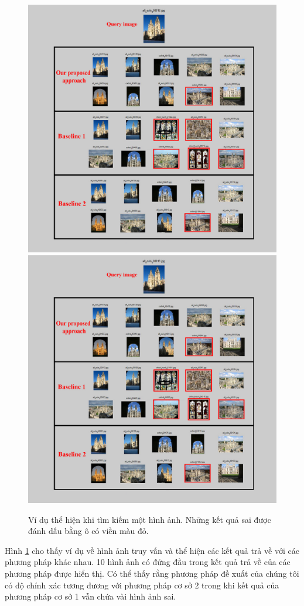 \begin{figure}[!htbp]
  \begin{center}
    \leavevmode
    \ifpdf
      \includegraphics[scale=0.25]{queryResult}
    \else
      \includegraphics[scale=0.25]{queryResult}
    \fi
    \caption[Ví dụ thể hiện kết quả khi tìm kiếm một hình ảnh]{Ví dụ thể hiện khi tìm kiếm một hình ảnh. Những kết quả sai được đánh dấu bằng ô có viền màu đỏ.}
    \label{FigResults}
  \end{center}
\end{figure}

Hình \ref{FigResults} cho thấy ví dụ về hình ảnh truy vấn và thể hiện các kết quả trả về với các phương pháp khác nhau. 10 hình ảnh có đứng đầu trong kết quả trả về của các phương pháp được hiển thị. Có thể thấy rằng phương pháp đề xuất của chúng tôi có độ chính xác tương đương với phương pháp cơ sở 2 trong khi kết quả của phương pháp cơ sở 1 vẫn chứa vài hình ảnh sai.
